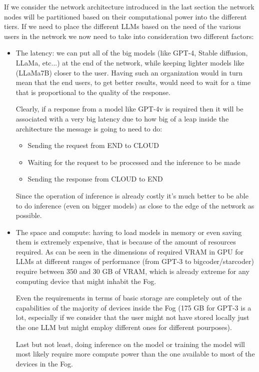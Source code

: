 If we consider the network architecture introduced in the last section the network nodes will be
partitioned based on their computational power into the different tiers. If we need to place the
different LLMs based on the need of the various users in the network we now need to take into
consideration two different factors:
\begin{itemize}
	\item The latency: we can put all of the big models (like GPT-4, Stable diffusion, LLaMa,
	      etc...) at the end of the network, while keeping lighter models like (LLaMa7B) closer to the
	      user. Having such an organization would in turn mean that the end users, to get better
	      results, would need to wait for a time that is proportional to the quality of the response.

	      Clearly, if a response from a model like GPT-4v is required then it will be associated with
	      a very big latency due to how big of a leap inside the architecture the message is going to
	      need to do:
	      \begin{itemize}
		      \item Sending the request from END to CLOUD
		      \item Waiting for the request to be processed and the inference to be made
		      \item Sending the response from CLOUD to END
	      \end{itemize}
	      Since the operation of inference is already costly it's much better to be able to do
	      inference (even on bigger models) as close to the edge of the network as possible.

	\item The space and compute: having to load models in memory or even saving them is
	      extremely expensive, that is because of the amount of resources required.
	      As can be seen in \cite{hug-optimization} the dimensions of required VRAM in GPU for LLMs at
	      different ranges of performance (from GPT-3 to bigcoder/starcoder) require between 350 and
	      30 GB of VRAM, which is already extreme for any computing device that might inhabit the Fog.

	      Even the requirements in terms of basic storage are completely out of the capabilities of
	      the majority of devices inside the Fog (175 GB for GPT-3 is a lot, especially if we consider
	      that the user might not have stored locally just the one LLM but might employ different ones
	      for different pourposes).

	      Last but not least, doing inference on the model or training the model will most likely
	      require more compute power than the one available to most of the devices in the Fog.
\end{itemize}

